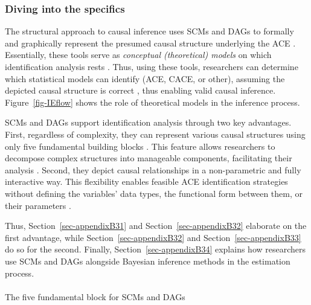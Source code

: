 \documentclass[
  authoryear,
  review,
  1p]{elsarticle}
\makeatletter
\let\oldparagraph\paragraph
\renewcommand{\paragraph}{
    \@ifstar
      \xxxParagraphStar
      \xxxParagraphNoStar
  }
\newcommand{\xxxParagraphStar}[1]{\oldparagraph*{#1}\mbox{}}
\newcommand{\xxxParagraphNoStar}[1]{\oldparagraph{#1}\mbox{}}
\makeatother
\begin{document}
\subsubsection{Diving into the specifics}\label{sec-appendixB3}

The structural approach to causal inference uses SCMs and DAGs to
formally and graphically represent the presumed causal structure
underlying the ACE
\citep{Pearl_2009, Pearl_et_al_2016, Gross_et_al_2018, Neal_2020}.
Essentially, these tools serve as \emph{conceptual (theoretical) models}
on which identification analysis rests
\citep[pp.~4]{Schuessler_et_al_2023}. Thus, using these tools,
researchers can determine which statistical models can identify (ACE,
CACE, or other), assuming the depicted causal structure is correct
\citep{McElreath_2020}, thus enabling valid causal inference.
Figure~\ref{fig-IEflow} shows the role of theoretical models in the
inference process.

SCMs and DAGs support identification analysis through two key
advantages. First, regardless of complexity, they can represent various
causal structures using only five fundamental building blocks
\citep{Neal_2020, McElreath_2020}. This feature allows researchers to
decompose complex structures into manageable components, facilitating
their analysis \citep{McElreath_2020}. Second, they depict causal
relationships in a non-parametric and fully interactive way. This
flexibility enables feasible ACE identification strategies without
defining the variables' data types, the functional form between them, or
their parameters \citep[pp.~35]{Pearl_et_al_2016}.

Thus, Section~\ref{sec-appendixB31} and Section~\ref{sec-appendixB32}
elaborate on the first advantage, while Section~\ref{sec-appendixB32}
and Section~\ref{sec-appendixB33} do so for the second. Finally,
Section~\ref{sec-appendixB34} explains how researchers use SCMs and DAGs
alongside Bayesian inference methods in the estimation process.

\paragraph{The five fundamental block for SCMs and
DAGs}\label{sec-appendixB31}
\end{document}
